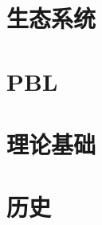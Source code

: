 \documentclass[UTF8,oneside]{ctexbook}
\begin{document}



\part{生态系统}





%
%
%

\part{PBL}




\part{理论基础}











% 









\part{历史}









\end{document}
